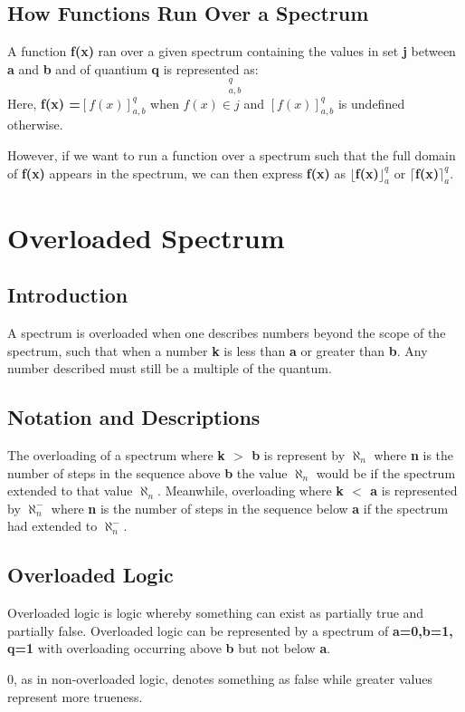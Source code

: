 \documentclass[12pt]{scrreprt}
\begin{document}
\section{How Functions Run Over a Spectrum}
A function \textbf{f(x)} ran over a given spectrum containing the values in set \textbf{j} between \textbf{a} and \textbf{b} and of quantium \textbf{q} is represented as:
\begin{equation}[f(x)]_{a,b}^q
\end{equation}
Here, \textbf{f(x) =$ [f(x)]_{a,b}^q$} when \textbf{$f(x) \in j$} and \textbf{$[f(x)]_{a,b}^q$} is undefined otherwise.
\par However, if we want to run a function over a spectrum such that the full domain of \textbf{f(x)} appears in the spectrum, we can then express \textbf{f(x)} as  \textbf{$\lfloor$f(x)$\rfloor_a^q $} or \textbf{$\lceil$f(x)$\rceil_a^q $}.
\chapter{Overloaded Spectrum}
\section{Introduction}
A spectrum is overloaded when one describes numbers beyond the scope of the spectrum, such that when a number \textbf{k} is less than  \textbf{a} or greater than \textbf{b}. Any number described must still be a multiple of the quantum. 
\section{Notation and Descriptions}
The overloading of a spectrum where \textbf{k $>$ b}  is represent by $\aleph_n$ where \textbf{n} is the number of steps in the sequence above \textbf{b} the value  $\aleph_n$ would be if the spectrum extended to that value  $\aleph_n$. Meanwhile, overloading where  \textbf{k $<$ a} is represented by  $\aleph_n^-$ where \textbf{n} is the number of steps in the sequence below \textbf{a} if the spectrum had extended to $\aleph_n^-$.
\section{Overloaded Logic}
Overloaded logic is logic whereby something can exist as partially true and partially false. Overloaded logic can be represented by a spectrum of \textbf{a=0,b=1, q=1} with overloading occurring above \textbf{b} but not below \textbf{a}. \par0, as in non-overloaded logic, denotes something as false while greater values represent more trueness. 
\end{document}
